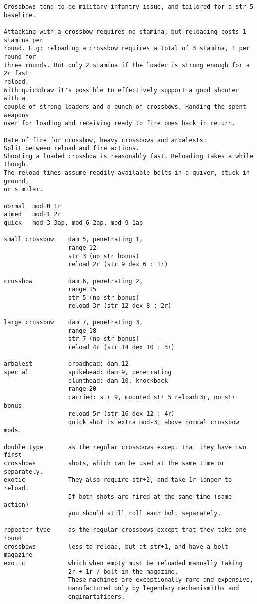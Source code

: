 \begin{verbatim}
\end{verbatim} \goodbreak \begin{verbatim}
Crossbows tend to be military infantry issue, and tailored for a str 5 baseline.

Attacking with a crossbow requires no stamina, but reloading costs 1 stamina per 
round. E.g: reloading a crossbow requires a total of 3 stamina, 1 per round for
three rounds. But only 2 stamina if the loader is strong enough for a 2r fast 
reload.
With quickdraw it's possible to effectively support a good shooter with a 
couple of strong loaders and a bunch of crossbows. Handing the spent weapons
over for loading and receiving ready to fire ones back in return.

Rate of fire for crossbow, heavy crossbows and arbalests:
Split between reload and fire actions.
Shooting a loaded crossbow is reasonably fast. Reloading takes a while though.
The reload times assume readily available bolts in a quiver, stuck in ground, 
or similar.

normal  mod=0 1r
aimed   mod+1 2r
quick   mod-3 3ap, mod-6 2ap, mod-9 1ap

small crossbow    dam 5, penetrating 1,
                  range 12
                  str 3 (no str bonus)
                  reload 2r (str 9 dex 6 : 1r)

crossbow          dam 6, penetrating 2,
                  range 15
                  str 5 (no str bonus)
                  reload 3r (str 12 dex 8 : 2r)

large crossbow    dam 7, penetrating 3,
                  range 18
                  str 7 (no str bonus)
                  reload 4r (str 14 dex 10 : 3r)

arbalest          broadhead: dam 12
special           spikehead: dam 9, penetrating
                  blunthead: dam 10, knockback
                  range 20
                  carried: str 9, mounted str 5 reload+3r, no str bonus
                  reload 5r (str 16 dex 12 : 4r)
                  quick shot is extra mod-3, above normal crossbow mods.

double type       as the regular crossbows except that they have two first
crossbows         shots, which can be used at the same time or separately.
exotic            They also require str+2, and take 1r longer to reload.
                  If both shots are fired at the same time (same action)
                  you should still roll each bolt separately.

repeater type     as the regular crossbows except that they take one round
crossbows         less to reload, but at str+1, and have a bolt magazine
exotic            which when empty must be reloaded manually taking
                  2r + 1r / bolt in the magazine.
                  These machines are exceptionally rare and expensive, 
                  manufactured only by legendary mechanismiths and 
                  enginartificers.


\end{verbatim}

